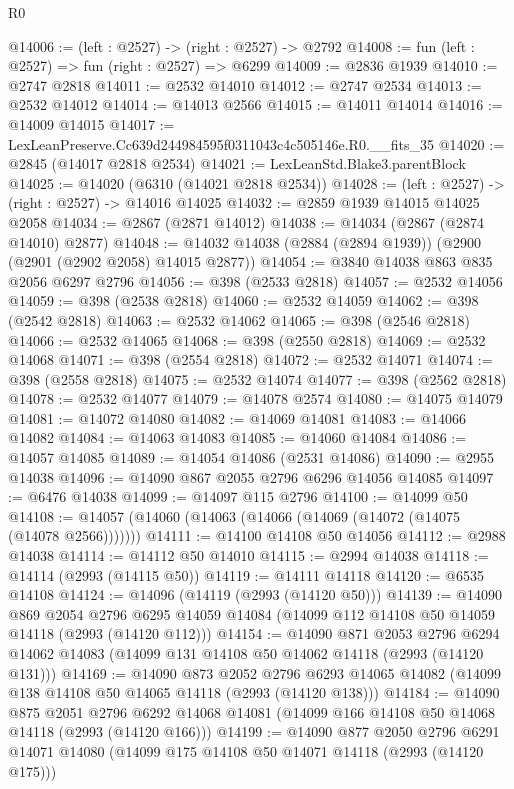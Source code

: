 \begin{lexlean}{R0}
\begin{coremodule}
@14006 := (left : @2527) -> (right : @2527) -> @2792
@14008 := fun (left : @2527) => fun (right : @2527) => @6299
@14009 := @2836 @1939
@14010 := @2747 @2818
@14011 := @2532 @14010
@14012 := @2747 @2534
@14013 := @2532 @14012
@14014 := @14013 @2566
@14015 := @14011 @14014
@14016 := @14009 @14015
@14017 := LexLeanPreserve.Cc639d244984595f0311043c4c505146e.R0.__fits_35
@14020 := @2845 (@14017 @2818 @2534)
@14021 := LexLeanStd.Blake3.parentBlock
@14025 := @14020 (@6310 (@14021 @2818 @2534))
@14028 := (left : @2527) -> (right : @2527) -> @14016 @14025
@14032 := @2859 @1939 @14015 @14025 @2058
@14034 := @2867 (@2871 @14012)
@14038 := @14034 (@2867 (@2874 @14010) @2877)
@14048 := @14032 @14038 (@2884 (@2894 @1939)) (@2900 (@2901 (@2902 @2058) @14015 @2877))
@14054 := @3840 @14038 @863 @835 @2056 @6297 @2796
@14056 := @398 (@2533 @2818)
@14057 := @2532 @14056
@14059 := @398 (@2538 @2818)
@14060 := @2532 @14059
@14062 := @398 (@2542 @2818)
@14063 := @2532 @14062
@14065 := @398 (@2546 @2818)
@14066 := @2532 @14065
@14068 := @398 (@2550 @2818)
@14069 := @2532 @14068
@14071 := @398 (@2554 @2818)
@14072 := @2532 @14071
@14074 := @398 (@2558 @2818)
@14075 := @2532 @14074
@14077 := @398 (@2562 @2818)
@14078 := @2532 @14077
@14079 := @14078 @2574
@14080 := @14075 @14079
@14081 := @14072 @14080
@14082 := @14069 @14081
@14083 := @14066 @14082
@14084 := @14063 @14083
@14085 := @14060 @14084
@14086 := @14057 @14085
@14089 := @14054 @14086 (@2531 @14086)
@14090 := @2955 @14038
@14096 := @14090 @867 @2055 @2796 @6296 @14056 @14085
@14097 := @6476 @14038
@14099 := @14097 @115 @2796
@14100 := @14099 @50
@14108 := @14057 (@14060 (@14063 (@14066 (@14069 (@14072 (@14075 (@14078 @2566)))))))
@14111 := @14100 @14108 @50 @14056
@14112 := @2988 @14038
@14114 := @14112 @50 @14010
@14115 := @2994 @14038
@14118 := @14114 (@2993 (@14115 @50))
@14119 := @14111 @14118
@14120 := @6535 @14108
@14124 := @14096 (@14119 (@2993 (@14120 @50)))
@14139 := @14090
    @869
    @2054
    @2796
    @6295
    @14059
    @14084
    (@14099 @112 @14108 @50 @14059 @14118 (@2993 (@14120 @112)))
@14154 := @14090
    @871
    @2053
    @2796
    @6294
    @14062
    @14083
    (@14099 @131 @14108 @50 @14062 @14118 (@2993 (@14120 @131)))
@14169 := @14090
    @873
    @2052
    @2796
    @6293
    @14065
    @14082
    (@14099 @138 @14108 @50 @14065 @14118 (@2993 (@14120 @138)))
@14184 := @14090
    @875
    @2051
    @2796
    @6292
    @14068
    @14081
    (@14099 @166 @14108 @50 @14068 @14118 (@2993 (@14120 @166)))
@14199 := @14090
    @877
    @2050
    @2796
    @6291
    @14071
    @14080
    (@14099 @175 @14108 @50 @14071 @14118 (@2993 (@14120 @175)))

\end{coremodule}
\end{lexlean}
